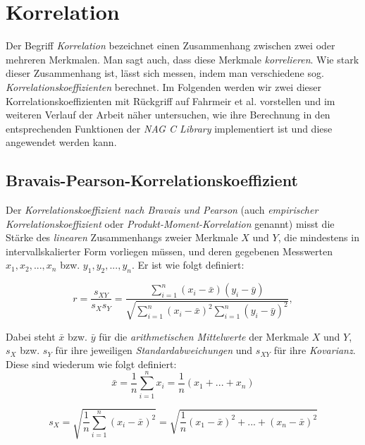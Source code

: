 \section{Korrelation}

Der Begriff {\it Korrelation} bezeichnet einen Zusammenhang zwischen zwei oder mehreren Merkmalen. Man sagt auch, dass diese Merkmale {\it korrelieren}. Wie stark dieser Zusammenhang ist, lässt sich messen, indem man verschiedene sog. {\it Korrelationskoeffizienten} berechnet. Im Folgenden werden wir zwei dieser Korrelationskoeffizienten mit Rückgriff auf Fahrmeir et al. \cite{Fahrmeir2010} vorstellen und im weiteren Verlauf der Arbeit näher untersuchen, wie ihre Berechnung in den entsprechenden Funktionen der {\it NAG C Library} implementiert ist und diese angewendet werden kann.

\subsection{Bravais-Pearson-Korrelationskoeffizient}
\label{sec:corr_per}

Der {\it Korrelationskoeffizient nach Bravais und Pearson} (auch {\it empirischer Korrelationskoeffizient} oder {\it Produkt-Moment-Korrelation} genannt) misst die Stärke des {\it linearen} Zusammenhangs zweier Merkmale $X$ und $Y$, die mindestens in intervallskalierter Form vorliegen müssen, und deren gegebenen Messwerten $x_1,x_2,...,x_n$ bzw. $y_1,y_2,...,y_n$. Er ist wie folgt definiert:

\begin{equation*}
	r=\dfrac{s_{XY}}{s_Xs_Y}=\dfrac{\sum_{i=1}^{n}{(x_i-\bar{x})(y_i-\bar{y})}}{\sqrt{\sum_{i=1}^{n}{(x_i-\bar{x})^2\sum_{i=1}^{n}{(y_i-\bar{y})^2}}}},
\end{equation*}

\noindent Dabei steht $\bar{x}$ bzw. $\bar{y}$ für die {\it arithmetischen Mittelwerte} der Merkmale $X$ und $Y$, $s_{X}$ bzw. $s_{Y}$ für ihre jeweiligen {\it Standardabweichungen} und $s_{XY}$ für ihre {\it Kovarianz}. Diese sind wiederum wie folgt definiert:\\

\begin{equation*}
	\bar{x}=\dfrac{1}{n}\sum_{i=1}^{n}{x_i}=\dfrac{1}{n}(x_1+...+x_n)
\end{equation*}

\begin{equation*}
	s_X=\sqrt{\dfrac{1}{n}\sum_{i=1}^{n}{(x_i-\bar{x})^2}}=\sqrt{\dfrac{1}{n}(x_1-\bar{x})^2+...+(x_n-\bar{x})^2}
\end{equation*}

